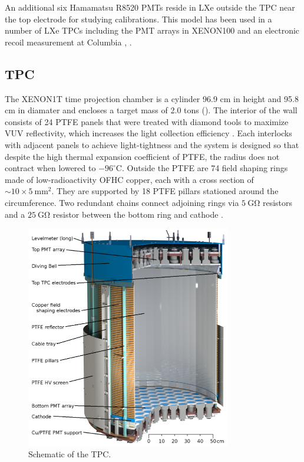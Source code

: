 An additional six Hamamatsu R8520 PMTs reside in LXe outside the TPC near the top electrode for studying calibrations.  This model has
been used in a number of LXe TPCs including the PMT arrays in XENON100 and an electronic recoil measurement at
Columbia , .




\subsection{TPC}
\label{subsec:xenon1t_tpc}
The XENON1T time projection chamber is a cylinder 96.9 cm in height and 95.8 cm in diamater and encloses a target mass of 2.0 tons
().  The interior of the wall consists of 24 PTFE panels that were treated with diamond tools to
maximize VUV reflectivity, which increases the light collection efficiency .  Each interlocks with adjacent panels
to achieve light-tightness and the system is designed so that despite the high thermal expansion coefficient of PTFE, the radius does not
contract when lowered to $-96^{\circ}\mathrm{C}$.  Outside the PTFE are 74
field shaping rings made of low-radioactivity OFHC copper, each with a cross section of ${\sim} 10 \times 5\ \mathrm{mm^{2}}$.  They are
supported by 18 PTFE pillars stationed around the circumference.  Two redundant
chains connect adjoining rings via $5\ \mathrm{G \Omega}$ resistors and a $25\ \mathrm{G \Omega}$ resistor between the bottom ring and
cathode .

\begin{figure}
\centering
\includegraphics[width=0.8\textwidth]{XENON1TTPC}
\caption{Schematic of the TPC.}
\label{fig:xenon1t_tpc_tpc}
\end{figure}

